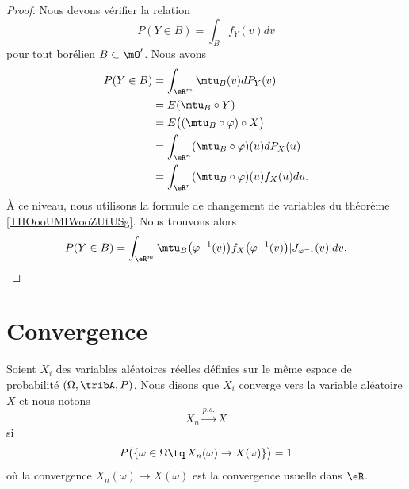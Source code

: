 \begin{proof}
    Nous devons vérifier la relation 
    \begin{equation}
        P(Y\in B)=\int_Bf_Y(v)dv
    \end{equation}
    pour tout borélien \( B\subset \mO'\). Nous avons
    \begin{subequations}
        \begin{align}
            P(Y\in B)&=\int_{\eR^m}\mtu_{B}(v)dP_Y(v)\\
            &=E(\mtu_B\circ Y)\\
            &=E\big( (\mtu_B\circ \varphi)\circ X\big)\\
            &=\int_{\eR^n}(\mtu_B\circ\varphi)(u)dP_X(u)\\
            &=\int_{\eR^n}(\mtu_B \circ\varphi)(u)f_X(u)du.
        \end{align}
    \end{subequations}
    À ce niveau, nous utilisons la formule de changement de variables du théorème \ref{THOooUMIWooZUtUSg}. Nous trouvons alors
    \begin{equation}
        P(Y\in B)=\int_{\eR^m}\mtu_B\big( \varphi^{-1}(v) \big)f_X\big( \varphi^{-1}(v) \big)| J_{\varphi^{-1}}(v) |dv.
    \end{equation}
\end{proof}

\section{Convergence}

Soient \( X_i\) des variables aléatoires réelles définies sur le même espace de probabilité \( (\Omega,\tribA,P)\). Nous disons que \( X_i\) converge  vers la variable aléatoire \( X\) et nous notons 
\begin{equation}
    X_n\stackrel{p.s.}{\longrightarrow}X
\end{equation}
si
\begin{equation}
    P\big( \{ \omega\in\Omega\tq\,X_n(\omega)\to X(\omega) \} \big)=1
\end{equation}
où la convergence \( X_n(\omega)\to X(\omega)\) est la convergence usuelle dans \( \eR\).

